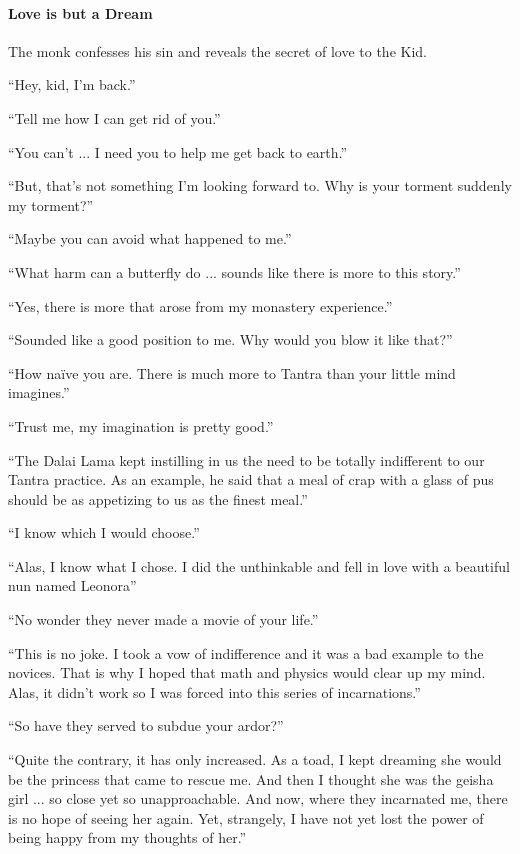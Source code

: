 \paragraph{Love is but a Dream}

The monk confesses his sin and reveals the secret of love to the Kid.

``Hey, kid, I'm back.''

``Tell me how I can get rid of you.''

``You can't ... I need you to help me get back to earth.''

``But, that's not something I'm looking forward to. Why is your torment suddenly my torment?''

``Maybe you can avoid what happened to me.''

``What harm can a butterfly do ... sounds like there is more to this story.''

``Yes, there is more that arose from my monastery experience.''

``Sounded like a good position to me. Why would you blow it like that?''

``How naïve you are. There is much more to Tantra than your little mind imagines.''

``Trust me, my imagination is pretty good.''

``The Dalai Lama kept instilling in us the need to be totally indifferent to our Tantra practice. As an example, he said that a meal of crap with a glass of pus should be as appetizing to us as the finest meal.''

``I know which I would choose.''

``Alas, I know what I chose. I did the unthinkable and fell in love with a beautiful nun named Leonora''

``No wonder they never made a movie of your life.''

``This is no joke. I took a vow of indifference and it was a bad example to the novices. That is why I hoped that math and physics would clear up my mind. Alas, it didn't work so I was forced into this series of incarnations.''

``So have they served to subdue your ardor?''

``Quite the contrary, it has only increased. As a toad, I kept dreaming she would be the princess that came to rescue me. And then I thought she was the geisha girl ... so close yet so unapproachable. And now, where they incarnated me, there is no hope of seeing her again. Yet, strangely, I have not yet lost the power of being happy from my thoughts of her.''

